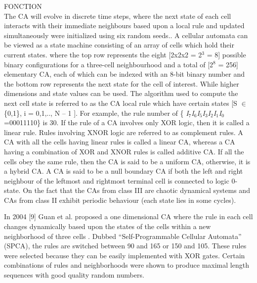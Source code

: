 %
\label{Cellular Automata}
FONCTION\\
The CA will evolve in discrete time steps, where the next state of each cell interacts with their immediate neighbours based upon a local rule and updated simultaneously were initialized using six random seeds.. A cellular automata can be viewed as a state machine consisting of an array of cells which hold their current states. where the top row represents the eight [2x2x2 = 2${}^{3}$ = 8] possible binary configurations for a three-cell neighbourhood and a total of [2${}^{8}$ = 256] elementary CA, each of which can be indexed with an 8-bit binary number and the bottom row represents the next state for the cell of interest. While higher dimensions and state values can be used. The algorithm used to compute the next cell state is referred to as the CA local rule which have certain states [S $\in $ \{0,1\}, i = 0,1,.., N -- 1 ]. For example, the rule number of \{ \textit{I${}_{7}$I${}_{6}$I${}_{5}$I${}_{3}$I${}_{2}$I${}_{1}$I${}_{0}$} =00011110\} is 30. If the rule of a CA involves only XOR logic, then it is called a linear rule. Rules involving XNOR logic are referred to as complement rules. A CA with all the cells having linear rules is called a linear CA, whereas a CA having a combination of XOR and XNOR rules is called additive CA. If all the cells obey the same rule, then the CA is said to be a uniform CA, otherwise, it is a hybrid CA. A CA is said to be a null boundary CA if both the left and right neighbour of the leftmost and rightmost terminal cell is connected to logic 0-state. On the fact that the CAs from class III are chaotic dynamical systems and CAs from class II exhibit periodic behaviour (each state lies in some cycles).

In 2004 [9] Guan et al. proposed a one dimensional CA where the rule in each cell changes dynamically based upon the states of the cells within a new neighborhood of three cells . Dubbed “Self-Programmable Cellular Automata” (SPCA), the rules are switched between 90 and 165 or 150 and 105. These rules were selected because they can be easily implemented with XOR gates. Certain combinations of rules and neighborhoods were shown to produce maximal length sequences with good quality random numbers.

